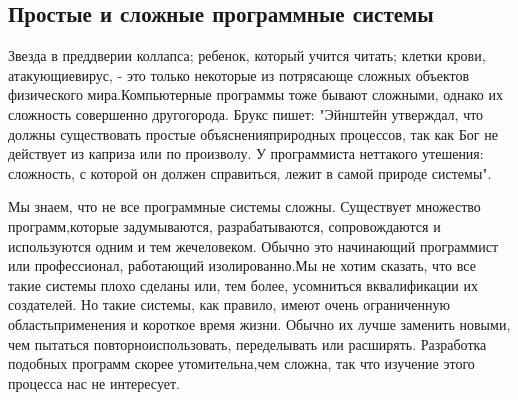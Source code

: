 \documentclass[10pt]{article}
\begin{document}
\subsection{Простые и сложные программные системы}
Звезда в преддверии коллапса; ребенок, который учится читать; клетки крови, атакующие\linebreak вирус, - это только некоторые из потрясающе сложных объектов физического мира.\linebreak  Компьютерные программы тоже бывают сложными, однако их сложность совершенно другого\linebreak  рода. Брукс пишет: "Эйнштейн утверждал, что должны существовать простые объяснения\linebreak  природных процессов, так как Бог не действует из каприза или по произволу. У программиста нет\linebreak  такого утешения: сложность, с которой он должен справиться, лежит в самой природе системы"\linebreak  \cite{Brooks}.

Мы знаем, что не все программные системы сложны. Существует множество программ,\linebreak  которые задумываются, разрабатываются, сопровождаются и используются одним и тем же\linebreak  человеком. Обычно это начинающий программист или профессионал, работающий изолированно.\linebreak  Мы не хотим сказать, что все такие системы плохо сделаны или, тем более, усомниться в\linebreak  квалификации их создателей. Но такие системы, как правило, имеют очень ограниченную область\linebreak  применения и короткое время жизни. Обычно их лучше заменить новыми, чем пытаться повторно\linebreak  использовать, переделывать или расширять. Разработка подобных программ скорее утомительна,\linebreak  чем сложна, так что изучение этого процесса нас не интересует. \vspace{3mm}
\end{document}
